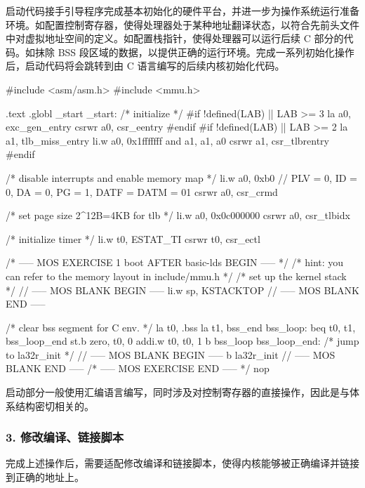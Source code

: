 启动代码接手引导程序完成基本初始化的硬件平台，并进一步为操作系统运行准备环境。如配置控制寄存器，使得处理器处于某种地址翻译状态，以符合先前头文件中对虚拟地址空间的定义。如配置栈指针，使得处理器可以运行后续 C 部分的代码。如抹除 BSS 段区域的数据，以提供正确的运行环境。完成一系列初始化操作后，启动代码将会跳转到由 C 语言编写的后续内核初始化代码。

\begin{CodeBlock}[language=BookC]
#include <asm/asm.h>
#include <mmu.h>

.text
.globl  _start
_start:
    /* initialize */
    #if !defined(LAB) || LAB >= 3
    la      a0, exc_gen_entry
    csrwr   a0, csr_eentry
    #endif
    #if !defined(LAB) || LAB >= 2
    la      a1, tlb_miss_entry
    li.w    a0, 0x1fffffff
    and     a1, a1, a0
    csrwr   a1, csr_tlbrentry
    #endif

    /* disable interrupts and enable memory map */
    li.w    a0, 0xb0     // PLV = 0, ID = 0, DA = 0, PG = 1, DATF = DATM = 01
    csrwr   a0, csr_crmd

    /* set page size 2^12B=4KB for tlb */
    li.w    a0, 0x0c000000
    csrwr   a0, csr_tlbidx

    /* initialize timer */
    li.w    t0, ESTAT_TI
    csrwr   t0, csr_ectl

    /* ----- MOS EXERCISE 1 boot AFTER basic-lds BEGIN ----- */
    /* hint: you can refer to the memory layout in include/mmu.h */
    /* set up the kernel stack */
    // ----- MOS BLANK BEGIN -----
    li.w    sp, KSTACKTOP
    // ----- MOS BLANK END -----

    /* clear bss segment for C env. */
    la      t0, .bss
    la      t1, bss_end
bss_loop:
    beq     t0, t1, bss_loop_end
    st.b    zero, t0, 0
    addi.w  t0, t0, 1
    b       bss_loop
bss_loop_end:
    /* jump to la32r_init */
    // ----- MOS BLANK BEGIN -----
    b       la32r_init
    // ----- MOS BLANK END -----
    /* ----- MOS EXERCISE END ----- */
    nop

\end{CodeBlock}

启动部分一般使用汇编语言编写，同时涉及对控制寄存器的直接操作，因此是与体系结构密切相关的。

\subsubsection{3. 修改编译、链接脚本}\label{sec:13-operating-system-005}

完成上述操作后，需要适配修改编译和链接脚本，使得内核能够被正确编译并链接到正确的地址上。

